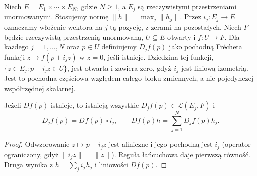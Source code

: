 Niech $E=E_1\times\cdots\times E_N$, gdzie $N\ge1$,
a $E_j$ są rzeczywistymi przestrzeniami unormowanymi.
Stosujemy normę $\|h\|=\max_j\|h_j\|$.
Przez $i_j:E_j\to E$ oznaczamy włożenie wektora
na $j$-tą pozycję, z zerami na pozostałych.
Niech $F$ będzie rzeczywistą przestrzenią unormowaną,
$U\subseteq E$ otwarty i $f:U\to F$.
Dla każdego $j=1,\ldots,N$ oraz $p\in U$ definiujemy $D_jf(p)$ jako pochodną
Frécheta funkcji $z\mapsto f(p+i_jz)$ w $z=0$,
jeśli istnieje. Dziedzina tej funkcji,
$\{z\in E_j:p+i_jz\in U\}$, jest otwarta i zawiera zero,
gdyż $i_j$ jest liniową izometrią.
Jest to pochodna częściowa względem całego bloku
zmiennych, a nie pojedynczej współrzędnej skalarnej.

\begin{stwierdzenie}
\label{ma2:prop:frechet-blocks}
Jeżeli $Df(p)$ istnieje, to istnieją wszystkie
$D_jf(p)\in\mathcal L(E_j,F)$ i
\[
 D_jf(p)=Df(p)\circ i_j,\qquad
 Df(p)h=\sum_{j=1}^N D_jf(p)h_j.
\]
\end{stwierdzenie}
\begin{proof}
Odwzorowanie $z\mapsto p+i_jz$ jest afiniczne
i jego pochodną jest $i_j$ (operator ograniczony,
gdyż $\|i_jz\|=\|z\|$). Reguła łańcuchowa daje
pierwszą równość. Druga wynika z
$h=\sum_j i_jh_j$ i liniowości $Df(p)$.
\end{proof}

